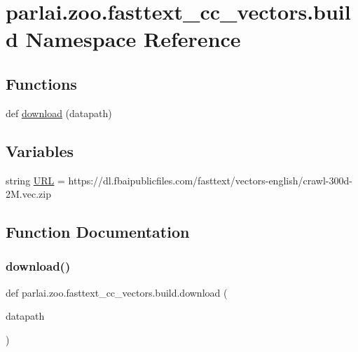 \hypertarget{namespaceparlai_1_1zoo_1_1fasttext__cc__vectors_1_1build}{}\section{parlai.\+zoo.\+fasttext\+\_\+cc\+\_\+vectors.\+build Namespace Reference}
\label{namespaceparlai_1_1zoo_1_1fasttext__cc__vectors_1_1build}
\subsection*{Functions}
\begin{DoxyCompactItemize}
\item 
def \hyperlink{namespaceparlai_1_1zoo_1_1fasttext__cc__vectors_1_1build_a493e8ecb82f7444a1eee020a8dd620ce}{download} (datapath)
\end{DoxyCompactItemize}
\subsection*{Variables}
\begin{DoxyCompactItemize}
\item 
string \hyperlink{namespaceparlai_1_1zoo_1_1fasttext__cc__vectors_1_1build_af27fa9f3a3f59eac5ae47c12f462ce5f}{U\+RL} = \textquotesingle{}https\+://dl.\+fbaipublicfiles.\+com/fasttext/vectors-\/english/crawl-\/300d-\/2\+M.\+vec.\+zip\textquotesingle{}
\end{DoxyCompactItemize}


\subsection{Function Documentation}
\mbox{\label{namespaceparlai_1_1zoo_1_1fasttext__cc__vectors_1_1build_a493e8ecb82f7444a1eee020a8dd620ce}} 
\subsubsection{\texorpdfstring{download()}{download()}}
{\footnotesize\ttfamily def parlai.\+zoo.\+fasttext\+\_\+cc\+\_\+vectors.\+build.\+download (\begin{DoxyParamCaption}\item[{}]{datapath }\end{DoxyParamCaption})}



